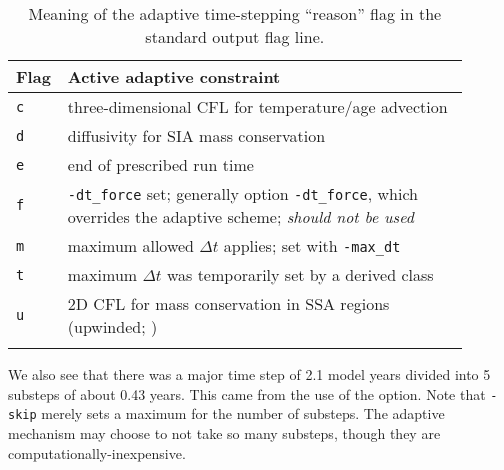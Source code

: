 \begin{table}[ht]
\caption{Meaning of the adaptive time-stepping ``reason'' flag in the standard output flag line.}\label{tab:adaptiveflag}
\begin{tabular}{p{0.05\linewidth}p{0.85\linewidth}}\hline
\textbf{Flag} & \textbf{Active adaptive constraint} \\ \hline
\verb|c| & three-dimensional CFL for temperature/age advection \cite{BBL} \\
\verb|d| & diffusivity for SIA mass conservation \cite{BBL} \\
\verb|e| & end of prescribed run time \\
\verb|f| & \verb|-dt_force| set; generally option \verb|-dt_force|, which overrides the adaptive scheme; \emph{should not be used}  \\
\verb|m| & maximum allowed $\Delta t$ applies; set with \verb|-max_dt| \\
\verb|t| & maximum $\Delta t$ was temporarily set by a derived class \\
\verb|u| & 2D CFL for mass conservation in SSA regions (upwinded; \cite{BBssasliding})\\
\hline
\normalsize
\end{tabular}
\end{table}

We also see that there was a major time step of 2.1 model years divided into 5 substeps of about 0.43 years.  This came from the use of the  option.  Note that \verb|-skip| merely sets a maximum for the number of substeps.  The adaptive mechanism may choose to not take so many substeps, though they are computationally-inexpensive.

